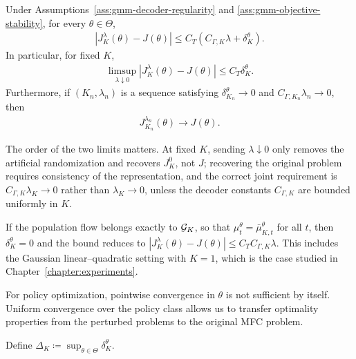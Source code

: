 \begin{theorem}
    \label{thm:gmm-objective-convergence}
    Under Assumptions~\ref{ass:gmm-decoder-regularity} and \ref{ass:gmm-objective-stability}, for every $\theta\in\Theta$,
    \begin{align}
        \left| J_K^\lambda(\theta) - J(\theta) \right| \leq C_T \left( C_{\Gamma,K}\lambda + \delta_K^\theta \right).
        \label{eq:gmm-total-objective-bound}
    \end{align}
    In particular, for fixed $K$,
    \begin{align}
        \limsup_{\lambda\downarrow0} \left| J_K^\lambda(\theta) - J(\theta) \right| \leq C_T\delta_K^\theta.
        \label{eq:gmm-fixed-k-bias}
    \end{align}
    Furthermore, if $(K_n,\lambda_n)$ is a sequence satisfying $\delta_{K_n}^\theta\to0$ and $C_{\Gamma,K_n}\lambda_n\to0$, then
    \begin{align}
        J_{K_n}^{\lambda_n}(\theta) \longrightarrow J(\theta).
        \label{eq:gmm-objective-joint-convergence}
    \end{align}
\end{theorem}

The order of the two limits matters. At fixed $K$, sending $\lambda\downarrow0$ only removes the artificial randomization and recovers $J_K^0$, not $J$; recovering the original problem requires consistency of the representation, and the correct joint requirement is $C_{\Gamma,K}\lambda_K\to0$ rather than $\lambda_K\to0$, unless the decoder constants $C_{\Gamma,K}$ are bounded uniformly in $K$.

If the population flow belongs exactly to ${\cal G}_K$, so that $\mu_t^\theta=\bar\mu_{K,t}^\theta$ for all $t$, then $\delta_K^\theta=0$ and the bound reduces to $|J_K^\lambda(\theta)-J(\theta)|\leq C_TC_{\Gamma,K}\lambda$. This includes the Gaussian linear--quadratic setting with $K=1$, which is the case studied in Chapter~\ref{chapter:experiments}.

For policy optimization, pointwise convergence in $\theta$ is not sufficient by itself. Uniform convergence over the policy class allows us to transfer optimality properties from the perturbed problems to the original MFC problem.

Define $\Delta_K \coloneqq \sup_{\theta\in\Theta} \delta_K^\theta$.

